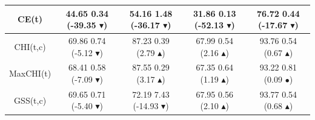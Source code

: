 \documentclass[10pt, red]{beamer}
\newcommand{\triangOK}{\textcolor[rgb]{00,0.45,0.10}{$\blacktriangle$}}
\newcommand{\triangBAD}{\textcolor[rgb]{0.7,00,00}{$\blacktriangledown$}}
\newcommand{\ball}{\textcolor[rgb]{0.7,0.70,0.0}{$\bullet$}}
\begin{document}
{\begin{table}[h]
\begin{adjustwidth}{-0.95cm}{-0.95cm}
\begin{tabular}{|c||c|c|c|c|}
\hline 
CE(t) & 44.65 \textpm{} 0.34 (-39.35 \triangBAD) & 54.16 \textpm{} 1.48 (-36.17 \triangBAD) & 31.86 \textpm{} 0.13 (-52.13 \triangBAD) & 76.72 \textpm{} 0.44 (-17.67 \triangBAD)\tabularnewline
\hline 
CHI(t,c) & 69.86 \textpm{} 0.74 (-5.12 \triangBAD) & 87.23 \textpm{} 0.39 (2.79 \triangOK) & 67.99 \textpm{} 0.54 (2.16 \triangOK) & 93.76 \textpm{} 0.54 (0.67 \triangOK)\tabularnewline
\hline 
MaxCHI(t) & 68.41 \textpm{} 0.58 (-7.09 \triangBAD) & 87.55 \textpm{} 0.29 (3.17 \triangOK) & 67.35 \textpm{} 0.64 (1.19 \triangOK) & 93.22 \textpm{} 0.81 (0.09 \ball)\tabularnewline
\hline 
GSS(t,c) & 69.65 \textpm{} 0.71 (-5.40 \triangBAD) & 72.19 \textpm{} 7.43 (-14.93 \triangBAD) & 67.95 \textpm{} 0.56 (2.10 \triangOK) & 93.77 \textpm{} 0.54 (0.68 \triangOK)\tabularnewline
\bottomrule
\end{tabular}
\end{adjustwidth}
\end{table}

}
\end{document}
